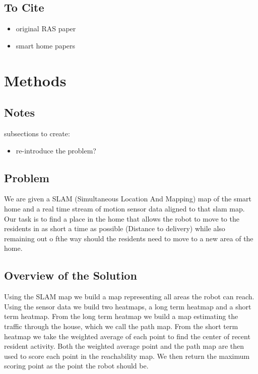 \documentclass[11pt, conference, a4paper]{IEEEtran}
\begin{document}
\subsection{To Cite}
\begin{itemize}
    \item original RAS paper
    \item smart home papers
\end{itemize}

\section{Methods}

\subsection{Notes}
subsections to create:
\begin{itemize}
    \item re-introduce the problem?
\end{itemize}

\subsection{Problem}
We are given a SLAM (Simultaneous Location And Mapping) map of the smart home
and a real time stream of motion sensor data aligned to that slam map.
Our task is to find a place in the home that allows the robot to move to the
residents in as short a time as possible (Distance to delivery) while also
remaining out o fthe way should the residents need to move to a new area of
the home.

\subsection{Overview of the Solution}
Using the SLAM map we build a map representing all areas the robot can reach.
Using the sensor data we build two heatmaps, a long term heatmap and a short
term heatmap. From the long term heatmap we build a map estimating the traffic
through the house, which we call the path map. From the short term heatmap we 
take the weighted average of each point to find the center of recent resident 
activity. Both the weighted average point and the path map are then used to
score each point in the reachability map. We then return the maximum scoring
point as the point the robot should be.
\end{document}
